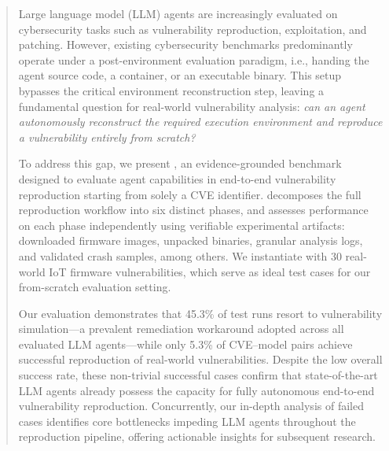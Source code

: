 
\begin{abstract}
    Large language model (LLM) agents are increasingly evaluated on cybersecurity tasks such as vulnerability reproduction, exploitation, and patching. However, existing cybersecurity benchmarks predominantly operate under a post-environment evaluation paradigm, i.e., handing the agent source code, a container, or an executable binary. This setup bypasses the critical environment reconstruction step, leaving a fundamental question for real-world vulnerability analysis: \emph{can an agent autonomously reconstruct the required execution environment and reproduce a vulnerability entirely from scratch?}
     
    To address this gap, we present \sys, an evidence-grounded benchmark designed to evaluate agent capabilities in end-to-end vulnerability reproduction starting from solely a CVE identifier. \sys{} decomposes the full reproduction workflow into six distinct phases, and assesses performance on each phase independently using verifiable experimental artifacts: downloaded firmware images, unpacked binaries, granular analysis logs, and validated crash samples, among others. We instantiate \sys{} with 30 real-world IoT firmware vulnerabilities, which serve as ideal test cases for our from-scratch evaluation setting.

    Our evaluation demonstrates that 45.3\% of test runs resort to vulnerability simulation---a prevalent remediation workaround adopted across all evaluated LLM agents---while only 5.3\% of CVE--model pairs achieve successful reproduction of real-world vulnerabilities. Despite the low overall success rate, these non-trivial successful cases confirm that state-of-the-art LLM agents already possess the capacity for fully autonomous end-to-end vulnerability reproduction. Concurrently, our in-depth analysis of failed cases identifies core bottlenecks impeding LLM agents throughout the reproduction pipeline, offering actionable insights for subsequent research.
\end{abstract}